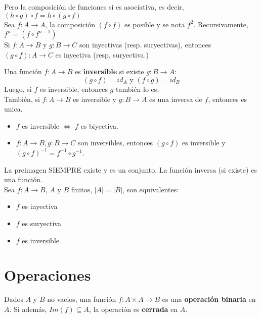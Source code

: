 \documentclass[11pt,a4paper]{article}
\begin{document}
Pero la composici\'on de funciones si es asociativa, es decir, $(h \circ g) \circ f = h \circ (g \circ f)$\\

Sea $f: A \rightarrow A$, la composici\'on $(f \circ f)$ es posible y se nota $f^2$. Recursivamente, $f^n = (f \circ f^{n-1})$\\

Si $f: A \rightarrow B$ y $g: B \rightarrow C$ son inyectivas (resp. suryectivas), entonces $(g \circ f) : A \rightarrow C$ es inyectiva (resp. suryectiva.)

\noindent \dotfill

Una funci\'on $f : A \rightarrow B$ es \textbf{inversible} si existe $g : B \rightarrow A :$ $$(g\circ f) = id_A \text{  y  } (f\circ g) = id_B$$
Luego, si $f$ es inversible, entonces $g$ tambi\'en lo es.\\
Tambi\'en, si $f : A \rightarrow B$ es inversible y $g : B \rightarrow A$ es una inversa de $f$, entonces es unica.\\

\begin{itemize}
\item $f$ es inversible $\iff$ $f$ es biyectiva.
\item $f : A \rightarrow B, g: B \rightarrow C$ son inversibles, entonces $(g \circ f)$ es inversible y $(g \circ f)^{-1} = f^{-1} \circ g^{-1}$.
\end{itemize}

La preimagen SIEMPRE existe y es un conjunto. La funci\'on inversa (si existe) es una funci\'on.\\

Sea $f:A \rightarrow B$, $A$ y $B$ finitos, $|A| = |B|$, son equivalentes:
\begin{multicols}{3}
\begin{itemize}
\item $f$ es inyectiva
\item $f$ es suryectiva
\item $f$ es inversible
\end{itemize}
\end{multicols}

\noindent \dotfill

\newpage
\section{Operaciones}
Dados $A$ y $B$ no vacios, una funci\'on $f : A \times A \rightarrow B$ es una \textbf{operaci\'on binaria} en $A$. Si adem\'as, $Im(f) \subseteq A$, la operaci\'on es \textbf{cerrada} en $A$.\\
\end{document}
